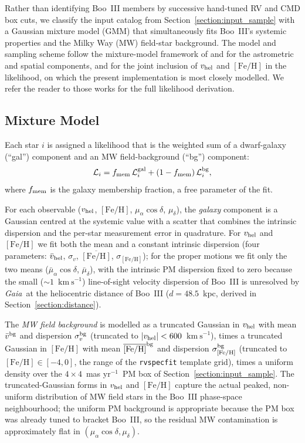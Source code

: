 \documentclass[twocolumn, apj, numberedappendix, appendixfloats]{openjournal_dhayaa}
\newcommand{\gaia}{\textit{Gaia}\xspace}
\newcommand{\vlosUnits}{$\mathrm{km~s}^{-1}$\xspace}
\newcommand{\pmUnits}{mas yr$^{-1}$\xspace}
\begin{document}
Rather than identifying Boo~III members by successive hand-tuned RV and CMD box cuts, we classify the input catalog from Section~\ref{section:input_sample} with a Gaussian mixture model (GMM) that simultaneously fits Boo~III's systemic properties and the Milky Way (MW) field-star background. The model and sampling scheme follow the mixture-model framework of \citet{Pace2019} and \citet{Pace2022} for the astrometric and spatial components, and \citet{Sandford2025} for the joint inclusion of $v_{\rm hel}$ and $[\mathrm{Fe/H}]$ in the likelihood, on which the present implementation is most closely modelled. We refer the reader to those works for the full likelihood derivation.

\subsection{Mixture Model}
Each star $i$ is assigned a likelihood that is the weighted sum of a dwarf-galaxy (``gal'') component and an MW field-background (``bg'') component:
\begin{equation} \label{eq:gmm_mix}
\mathcal{L}_i = f_{\rm mem}\,\mathcal{L}_i^{\rm gal} + (1 - f_{\rm mem})\,\mathcal{L}_i^{\rm bg},
\end{equation}
where $f_{\rm mem}$ is the galaxy membership fraction, a free parameter of the fit.

For each observable ($v_{\rm hel}$, $[\mathrm{Fe/H}]$, $\mu_\alpha\cos\delta$, $\mu_\delta$), the \emph{galaxy} component is a Gaussian centred at the systemic value with a scatter that combines the intrinsic dispersion and the per-star measurement error in quadrature. For $v_{\rm hel}$ and $[\mathrm{Fe/H}]$ we fit both the mean and a constant intrinsic dispersion (four parameters: $\bar v_{\rm hel}$, $\sigma_v$, $\overline{[\mathrm{Fe/H}]}$, $\sigma_{[\mathrm{Fe/H}]}$); for the proper motions we fit only the two means ($\bar\mu_\alpha\cos\delta$, $\bar\mu_\delta$), with the intrinsic PM dispersion fixed to zero because the small ($\sim 1$~\vlosUnits) line-of-sight velocity dispersion of Boo~III is unresolved by \gaia\ at the heliocentric distance of Boo~III ($d = 48.5$~kpc, derived in Section~\ref{section:distance}).

The \emph{MW field background} is modelled as a truncated Gaussian in $v_{\rm hel}$ with mean $\bar v^{\rm bg}$ and dispersion $\sigma_v^{\rm bg}$ (truncated to $|v_{\rm hel}| < 600$~\vlosUnits), times a truncated Gaussian in $[\mathrm{Fe/H}]$ with mean $\overline{[\mathrm{Fe/H}]}^{\rm bg}$ and dispersion $\sigma_{[\mathrm{Fe/H}]}^{\rm bg}$ (truncated to $[\mathrm{Fe/H}] \in [-4, 0]$, the range of the \texttt{rvspecfit} template grid), times a uniform density over the $4 \times 4$~\pmUnits\ PM box of Section~\ref{section:input_sample}. The truncated-Gaussian forms in $v_{\rm hel}$ and $[\mathrm{Fe/H}]$ capture the actual peaked, non-uniform distribution of MW field stars in the Boo~III phase-space neighbourhood; the uniform PM background is appropriate because the PM box was already tuned to bracket Boo~III, so the residual MW contamination is approximately flat in $(\mu_\alpha\cos\delta, \mu_\delta)$.
\end{document}
